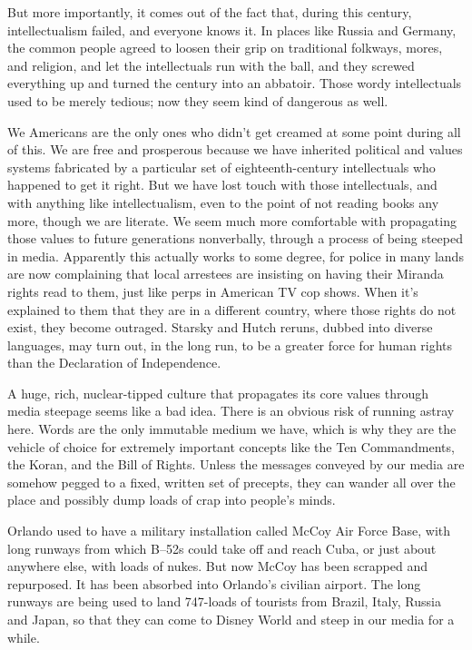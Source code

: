 \documentclass[
  fontsize=11pt,
  paper=landscape,
  twocolumn=true,
  pagesize=pdftex,
  headings=small,
  DIV=15,
  ]{scrartcl}
\begin{document}
But more importantly, it comes out of the fact that, during this
century, intellectualism failed, and everyone knows it. In places like
Russia and Germany, the common people agreed to loosen their grip on
traditional folkways, mores, and religion, and let the intellectuals run
with the ball, and they screwed everything up and turned the century
into an abbatoir. Those wordy intellectuals used to be merely tedious;
now they seem kind of dangerous as well.

We Americans are the only ones who didn't get creamed at some point
during all of this. We are free and prosperous because we have inherited
political and values systems fabricated by a particular set of
eighteenth-century intellectuals who happened to get it right. But we
have lost touch with those intellectuals, and with anything like
intellectualism, even to the point of not reading books any more, though
we are literate. We seem much more comfortable with propagating those
values to future generations nonverbally, through a process of being
steeped in media. Apparently this actually works to some degree, for
police in many lands are now complaining that local arrestees are
insisting on having their Miranda rights read to them, just like perps
in American TV cop shows. When it's explained to them that they are in a
different country, where those rights do not exist, they become
outraged. Starsky and Hutch reruns, dubbed into diverse languages, may
turn out, in the long run, to be a greater force for human rights than
the Declaration of Independence.

A huge, rich, nuclear-tipped culture that propagates its core values
through media steepage seems like a bad idea. There is an obvious risk
of running astray here. Words are the only immutable medium we have,
which is why they are the vehicle of choice for extremely important
concepts like the Ten Commandments, the Koran, and the Bill of Rights.
Unless the messages conveyed by our media are somehow pegged to a fixed,
written set of precepts, they can wander all over the place and possibly
dump loads of crap into people's minds.

Orlando used to have a military installation called McCoy Air Force
Base, with long runways from which B--52s could take off and reach Cuba,
or just about anywhere else, with loads of nukes. But now McCoy has been
scrapped and repurposed. It has been absorbed into Orlando's civilian
airport. The long runways are being used to land 747-loads of tourists
from Brazil, Italy, Russia and Japan, so that they can come to Disney
World and steep in our media for a while.
\end{document}
